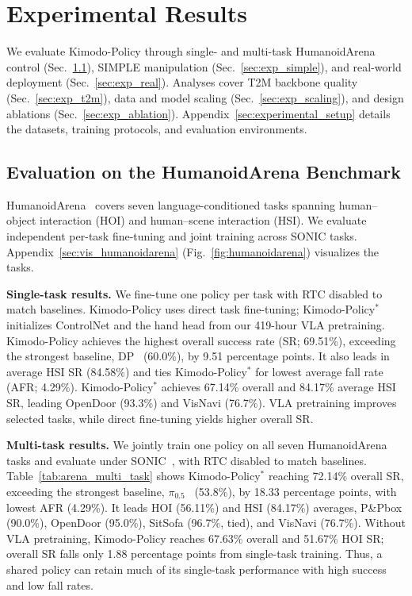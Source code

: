 \section{Experimental Results}
\label{sec:experiments}

We evaluate Kimodo-Policy through single- and multi-task HumanoidArena control (Sec.~\ref{sec:exp_simulation}), SIMPLE manipulation (Sec.~\ref{sec:exp_simple}), and real-world deployment (Sec.~\ref{sec:exp_real}). Analyses cover T2M backbone quality (Sec.~\ref{sec:exp_t2m}), data and model scaling (Sec.~\ref{sec:exp_scaling}), and design ablations (Sec.~\ref{sec:exp_ablation}). Appendix~\ref{sec:experimental_setup} details the datasets, training protocols, and evaluation environments.

\subsection{Evaluation on the HumanoidArena Benchmark}
\label{sec:exp_simulation}

HumanoidArena~\cite{humanoidarena} covers seven language-conditioned tasks spanning human--object interaction (HOI) and human--scene interaction (HSI). We evaluate independent per-task fine-tuning and joint training across SONIC tasks. Appendix~\ref{sec:vis_humanoidarena} (Fig.~\ref{fig:humanoidarena}) visualizes the tasks.

\begingroup
\setlength{\intextsep}{6pt plus 1pt minus 1pt}
\textbf{Single-task results.} We fine-tune one policy per task with RTC disabled to match baselines. Kimodo-Policy uses direct task fine-tuning; Kimodo-Policy$^{*}$ initializes ControlNet and the hand head from our 419-hour VLA pretraining. Kimodo-Policy achieves the highest overall success rate (SR; 69.51\%), exceeding the strongest baseline, DP~\cite{chi2023diffusionpolicy} (60.0\%), by 9.51 percentage points. It also leads in average HSI SR (84.58\%) and ties Kimodo-Policy$^{*}$ for lowest average fall rate (AFR; 4.29\%). Kimodo-Policy$^{*}$ achieves 67.14\% overall and 84.17\% average HSI SR, leading OpenDoor (93.3\%) and VisNavi (76.7\%). VLA pretraining improves selected tasks, while direct fine-tuning yields higher overall SR.



\textbf{Multi-task results.} We jointly train one policy on all seven HumanoidArena tasks and evaluate under SONIC~\cite{humanoidarena,sonic}, with RTC disabled to match baselines. Table~\ref{tab:arena_multi_task} shows Kimodo-Policy$^{*}$ reaching 72.14\% overall SR, exceeding the strongest baseline, $\pi_{0.5}$~\cite{pi05} (53.8\%), by 18.33 percentage points, with lowest AFR (4.29\%). It leads HOI (56.11\%) and HSI (84.17\%) averages, P\&Pbox (90.0\%), OpenDoor (95.0\%), SitSofa (96.7\%, tied), and VisNavi (76.7\%). Without VLA pretraining, Kimodo-Policy reaches 67.63\% overall and 51.67\% HOI SR; overall SR falls only 1.88 percentage points from single-task training. Thus, a shared policy can retain much of its single-task performance with high success and low fall rates.

